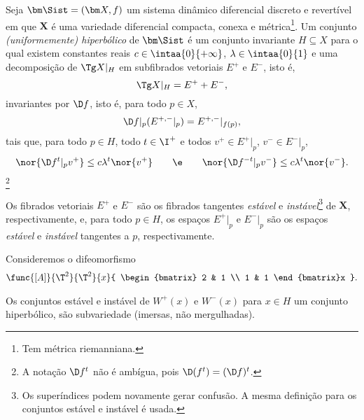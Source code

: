 \begin{definition}
Seja $\bm\Sist = (\bm X,f)$ um sistema dinâmico diferencial discreto e revertível em que $\bm X$ é uma variedade diferencial compacta, conexa e métrica\footnote{Tem métrica riemanniana.}. Um conjunto \emph{(uniformemente) hiperbólico} de $\bm\Sist$ é um conjunto invariante
$H \subseteq X$ para o qual existem constantes reais $c \in \intaa{0}{+\infty}$, $\lambda \in \intaa{0}{1}$ e uma decomposição	 de $\Tg X|_H$ em subfibrados vetoriais $E^+$ e $E^-$, isto é,
	\begin{equation*}
	\Tg X|_H = E^+ + E^-,
	\end{equation*}
invariantes por $\D f$, isto é, para todo $p \in X$,
	\begin{equation*}
	\D f|_p(E^{+,-}|_p) = E^{+,-}|_{f(p)},
	\end{equation*}
tais que, para todo $p \in H$, todo $t \in \I^+$ e todos $v^+ \in E^+|_p$, $v^- \in E^-|_p$,
	\begin{equation*}
	\nor{\D f^t|_p v^+} \leq c\lambda^t \nor{v^+} \qquad\e\qquad \nor{\D f^{-t}|_p v^-} \leq c\lambda^t \nor{v^-}.
	\end{equation*}
\footnote{A notação $\D f^t$ não é ambígua, pois $\D(f^t) = (\D f)^t$.}

Os fibrados vetoriais $E^+$ e $E^-$ são os fibrados tangentes \emph{estável} e \emph{instável}\footnote{	Os superíndices podem novamente gerar confusão. A mesma definição para os conjuntos estável e instável é usada.} de $\bm X$, respectivamente, e, para todo $p \in H$, os espaços $E^+|_p$ e $E^-|_p$ são os espaços \emph{estável} e \emph{instável} tangentes a $p$, respectivamente.
\end{definition}


\begin{example}
Consideremos o difeomorfismo
	\begin{align*}
	\func{[A]}{\T^2}{\T^2}{x}{
		\begin{bmatrix}
		2 & 1 \\
		1 & 1
		\end{bmatrix}x
	}.
	\end{align*}
\end{example}

\begin{proposition}
Os conjuntos estável e instável de $W^+(x)$ e $W^-(x)$ para $x \in H$ um conjunto hiperbólico, são subvariedade (imersas, não mergulhadas).
\end{proposition}

